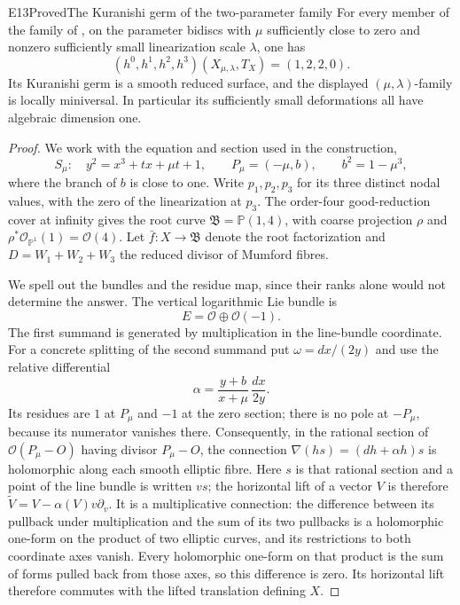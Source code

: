 
\begin{statement}{E13}{Proved}{The Kuranishi germ of the two-parameter family}
For every member of the family of
\cite[Proposition labelled \texttt{family}]{Viaclovsky2026Two}, on the parameter
bidiscs with $\mu$ sufficiently close to zero and nonzero sufficiently
small linearization scale $\lambda$, one has
\[
 (h^0,h^1,h^2,h^3)(X_{\mu,\lambda},T_X)=(1,2,2,0).
\]
Its Kuranishi germ is a smooth reduced surface, and the displayed
$(\mu,\lambda)$-family is locally miniversal. In particular its
sufficiently small deformations all have algebraic dimension one.
\end{statement}
\begin{proof}
We work with the equation and section used in the construction,
\[
 S_\mu:\quad y^2=x^3+tx+\mu t+1,\qquad
 P_\mu=(-\mu,b),\qquad b^2=1-\mu^3,
\]
where the branch of $b$ is close to one. Write $p_1,p_2,p_3$ for its
three distinct nodal values, with the zero of the linearization at
$p_3$. The order-four good-reduction cover at infinity gives the
root curve $\mathfrak B=\mathbb P(1,4)$, with coarse projection
$\rho$ and $\rho^*\mathcal O_{\mathbb P^1}(1)=\mathcal O(4)$.
Let $\bar f:X\to\mathfrak B$ denote the root factorization and
$D=W_1+W_2+W_3$ the reduced divisor of Mumford fibres.

We spell out the bundles and the residue map, since their ranks alone
would not determine the answer. The vertical logarithmic Lie bundle
is
\[
 E=\mathcal O\oplus\mathcal O(-1).
\]
The first summand is generated by multiplication in the line-bundle
coordinate. For a concrete splitting of the second summand put
$\omega=dx/(2y)$ and use the relative differential
\begin{equation}\label{eq:E13-connection}
 \alpha=\frac{y+b}{x+\mu}\,\frac{dx}{2y}.
\end{equation}
Its residues are $1$ at $P_\mu$ and $-1$ at the zero section; there
is no pole at $-P_\mu$, because its numerator vanishes there.
Consequently, in the rational section of
$\mathcal O(P_\mu-O)$ having divisor $P_\mu-O$, the connection
$\nabla(hs)=(dh+\alpha h)s$ is holomorphic along each smooth
elliptic fibre. Here $s$ is that rational section and a point of
the line bundle is written $v s$; the horizontal lift of a vector
$V$ is therefore $\widetilde V=V-\alpha(V)v\partial_v$.
It is a multiplicative connection: the difference between its
pullback under multiplication and the sum of its two pullbacks is a
holomorphic one-form on the product of two elliptic curves, and its
restrictions to both coordinate axes vanish. Every holomorphic
one-form on that product is the sum of forms pulled back from those
axes, so this difference is zero. Its horizontal lift therefore
commutes with the lifted translation defining $X$.


\end{proof}
